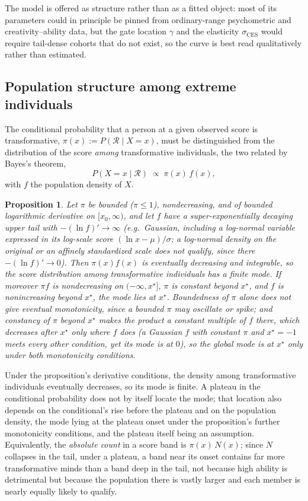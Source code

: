 \documentclass{article}
\newtheorem{proposition}{Proposition}
\begin{document}
The model is offered as structure rather than as a fitted object: most of its parameters could in principle be pinned from ordinary-range psychometric and creativity--ability data, but the gate location $\gamma$ and the elasticity $\sigma_{\mathrm{CES}}$ would require tail-dense cohorts that do not exist, so the curve is best read qualitatively rather than estimated.

\subsection{Population structure among extreme individuals}\label{app:population}
The conditional probability that a person at a given observed score is transformative, $\pi(x):=P(\mathcal{R}\mid X=x)$, must be distinguished from the distribution of the score \emph{among} transformative individuals, the two related by Bayes's theorem,
\[
P(X=x\mid \mathcal{R})\;\propto\;\pi(x)\,f(x),
\]
with $f$ the population density of $X$.

\begin{proposition}\label{app:prop-mode}
Let $\pi$ be bounded ($\pi \le 1$), nondecreasing, and of bounded logarithmic derivative on $[x_0, \infty)$, and let $f$ have a super-exponentially decaying upper tail with $-(\ln f)' \to \infty$ (e.g.\ Gaussian, including a log-normal variable expressed in its log-scale score $(\ln x - \mu)/\sigma$; a log-normal density on the original or an affinely standardized scale does not qualify, since there $-(\ln f)' \to 0$). Then $\pi(x) f(x)$ is eventually decreasing and integrable, so the score distribution among transformative individuals has a finite mode. If moreover $\pi f$ is nondecreasing on $(-\infty, x^{\star}]$, $\pi$ is constant beyond $x^{\star}$, and $f$ is nonincreasing beyond $x^{\star}$, the mode lies at $x^{\star}$. Boundedness of $\pi$ alone does not give eventual monotonicity, since a bounded $\pi$ may oscillate or spike; and constancy of $\pi$ beyond $x^{\star}$ makes the product a constant multiple of $f$ there, which decreases after $x^{\star}$ only where $f$ does (a Gaussian $f$ with constant $\pi$ and $x^{\star} = -1$ meets every other condition, yet its mode is at $0$), so the global mode is at $x^{\star}$ only under both monotonicity conditions.
\end{proposition}

\noindent Under the proposition's derivative conditions, the density among transformative individuals eventually decreases, so its mode is finite. A plateau in the conditional probability does not by itself locate the mode; that location also depends on the conditional's rise before the plateau and on the population density, the mode lying at the plateau onset under the proposition's further monotonicity conditions, and the plateau itself being an assumption. Equivalently, the \emph{absolute count} in a score band is $\pi(x)\,N(x)$; since $N$ collapses in the tail, under a plateau, a band near its onset contains far more transformative minds than a band deep in the tail, not because high ability is detrimental but because the population there is vastly larger and each member is nearly equally likely to qualify.
\end{document}
